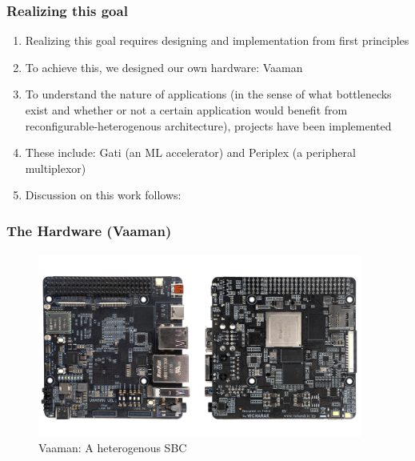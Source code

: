 \documentclass{beamer}
\begin{document}
\begin{frame}[fragile]
  \frametitle{Realizing this goal}
  \begin{enumerate}
    \item Realizing this goal requires designing and implementation from
      first principles
    \item To achieve this, we designed our own hardware: Vaaman
    \item To understand the nature of applications (in the sense of what
      bottlenecks exist and whether or not a certain application would
      benefit from reconfigurable-heterogenous architecture), projects have been implemented
    \item These include: Gati (an ML accelerator) and Periplex (a peripheral
      multiplexor)
    \item Discussion on this work follows:
  \end{enumerate}
  \framesubtitle{}
\end{frame}

\begin{frame}[fragile]
  \frametitle{The Hardware (Vaaman)}
  \framesubtitle{}
  \begin{figure}
    \centering
    \includegraphics[width=0.95\textwidth]{vaaman.jpg}
    \caption{Vaaman: A heterogenous SBC}
    \label{neuron}
  \end{figure}
\end{frame}
\end{document}
